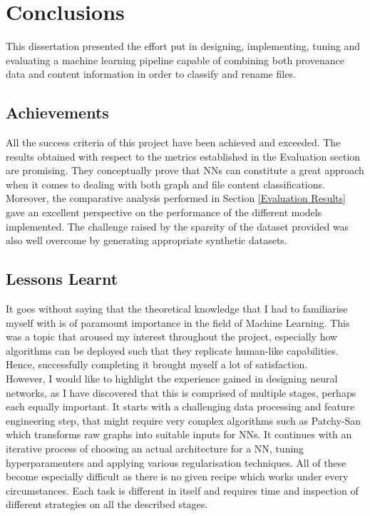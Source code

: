 
    
    \chapter{Conclusions}
    This dissertation presented the effort put in designing, implementing, tuning and evaluating a machine learning pipeline capable of combining both provenance data and content information in order to classify and rename files.
    
    \section{Achievements}
    All the success criteria of this project have been achieved and exceeded. The results obtained with respect to the metrics established in the Evaluation section are promising. They conceptually prove that NNs can constitute a great approach when it comes to dealing with both graph and file content classifications.  Moreover, the comparative analysis performed in Section \ref{Evaluation Results} gave an excellent perspective on the performance of the different models implemented. The challenge raised by the sparsity of the dataset provided was also well overcome by generating appropriate synthetic datasets.
    
    
    \section{Lessons Learnt}
    It goes without saying that the theoretical knowledge that I had to familiarise myself with is of paramount importance in the field of Machine Learning. This was a topic that aroused my interest throughout the project, especially how algorithms can be deployed such that they replicate human-like capabilities. Hence, successfully completing it brought myself a lot of satisfaction. \\
    
    However, I would like to highlight the experience gained in designing neural networks, as I have discovered that this is comprised of multiple stages, perhaps each equally important. It starts with a challenging data processing and feature engineering step, that might require very complex algorithms such as Patchy-San which transforms raw graphs into suitable inputs for NNs. It continues with an iterative process of choosing an actual architecture for a NN, tuning hyperparamenters and applying various regularisation techniques. All of these become especially difficult as there is no given recipe which works under every circumstances. Each task is different in itself and requires time and inspection of different strategies on all the described stages. \\
    
